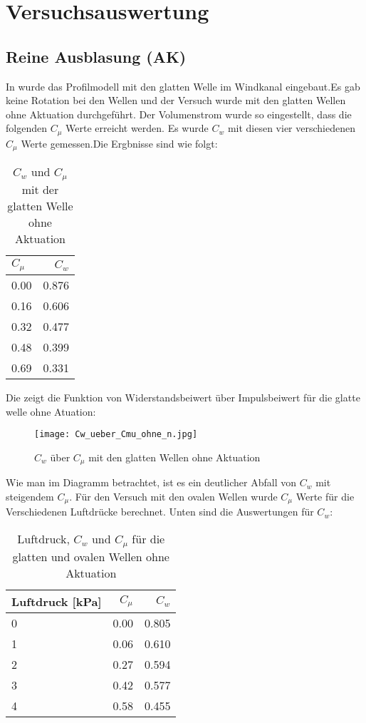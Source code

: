 \chapter{Versuchsauswertung}\label{s:auswertung}

\section{Reine Ausblasung (AK)}
\label{s:reineAusblasung}

In  wurde das Profilmodell mit den glatten Welle im Windkanal eingebaut.Es gab keine Rotation bei den Wellen und der Versuch wurde mit den glatten Wellen ohne Aktuation durchgef\"uhrt. Der Volumenstrom wurde so eingestellt, dass
die folgenden $C_{\mu}$  Werte erreicht werden. Es wurde $C_{w}$ mit diesen vier verschiedenen $C_{\mu}$ Werte gemessen.Die Ergbnisse sind wie folgt:
\begin{table}[h]
	\centering
	\begin{tabular}{lr}
		\toprule
		$C_{\mu}$ & $C_{w}$ \\
		\midrule
		0.00 & 0.876\\
		0.16 & 0.606\\
		0.32 & 0.477\\
		0.48 & 0.399\\
		0.69 & 0.331\\
		\bottomrule
	\end{tabular}
	\caption{$C_{w}$ und $C_{\mu}$ mit der glatten Welle ohne Aktuation }
	\label{tab:Cw-Cmu_Kon1}
\end{table}


Die  zeigt die Funktion von Widerstandsbeiwert \"uber Impulsbeiwert f\"ur die glatte welle ohne Atuation:
\begin{figure}[h]
	\centering
	\texttt{[image: Cw\_ueber\_Cmu\_ohne\_n.jpg]}
	\caption{$C_{w}$  \"uber $C_{\mu}$ mit den glatten Wellen ohne Aktuation }
	\label{fig:Cw-Cmu_Konf1}
\end{figure}

Wie man im Diagramm betrachtet, ist es ein deutlicher Abfall von $C_{w}$ mit steigendem $C_{\mu}$.
F\"ur den Versuch mit den ovalen Wellen wurde $C_{\mu}$ Werte f\"ur die Verschiedenen Luftdr\"ucke berechnet. Unten sind die Auswertungen f\"ur $C_{w}$:
 
\begin{table}[h]
	\centering
	\begin{tabular}{lrr}
		\toprule
		Luftdruck [kPa] & $C_{\mu}$ & $C_{w}$ \\
		\midrule
		0 & 0.00 & 0.805\\
		1 & 0.06 & 0.610\\
		2 & 0.27 & 0.594\\
		3 & 0.42 & 0.577\\
		4 & 0.58 & 0.455\\
		\bottomrule
	\end{tabular}\\
	\caption{Luftdruck, $C_{w}$  und $C_{\mu}$ f\"ur die glatten und ovalen Wellen ohne Aktuation}
	\label{tab:Cw-Cmu_Konf1+2}
\end{table}


